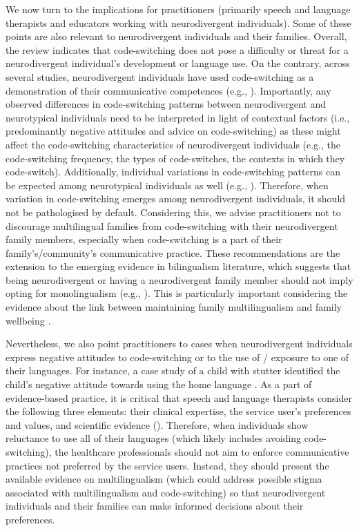 \documentclass[output=paper]{langscibook}
\begin{document}
We now turn to the implications for practitioners (primarily speech and language therapists and educators working with neurodivergent individuals). Some of these points are also relevant to neurodivergent individuals and their families. Overall, the review indicates that code-switching does not pose a difficulty or threat for a neurodivergent individual’s development or language use. On the contrary, across several studies, neurodivergent individuals have used code-switching as a demonstration of their communicative competences (e.g., \citealt{AnguloJimenez2020,Ponce-Lawler2017,Yu2016}). Importantly, any observed differences in code-switching patterns between neurodivergent and neurotypical individuals need to be interpreted in light of contextual factors (i.e., predominantly negative attitudes and advice on code-switching) as these might affect the code-switching characteristics of neurodivergent individuals (e.g., the code-switching frequency, the types of code-switches, the contexts in which they code-switch). Additionally, individual variations in code-switching patterns can be expected among neurotypical individuals as well (e.g., \citealt{CohenEtAl2025}). Therefore, when variation in code-switching emerges among neurodivergent individuals, it should not be pathologised by default. Considering this, we advise practitioners not to discourage multilingual families from code-switching with their neurodivergent family members, especially when code-switching is a part of their family’s/community’s communicative practice. These recommendations are the extension to the emerging evidence in bilingualism literature, which suggests that being neurodivergent or having a neurodivergent family member should not imply opting for monolingualism (e.g., \citealt{DigardEtAl2023,PrévostTuller2021,UljarevićEtAl2016}). This is particularly important considering the evidence about the link between maintaining family multilingualism and family wellbeing \citep{MullerEtAl2020}.

Nevertheless, we also point practitioners to cases when neurodivergent individuals express negative attitudes to code-switching or to the use of / exposure to one of their languages. For instance, a case study of a child with stutter identified the child’s negative attitude towards using the home language \citep{Karniol1992}. As a part of evidence-based practice, it is critical that speech and language therapists consider the following three elements: their clinical expertise, the service user’s preferences and values, and scientific evidence (\citealt{HealthandCareProfessionsCouncil2023, Royalnd}). Therefore, when individuals show reluctance to use all of their languages (which likely includes avoiding code-switching), the healthcare professionals should not aim to enforce communicative practices not preferred by the service users. Instead, they should present the available evidence on multilingualism (which could address possible stigma associated with multilingualism and code-switching) so that neurodivergent individuals and their families can make informed decisions about their preferences.
\end{document}
